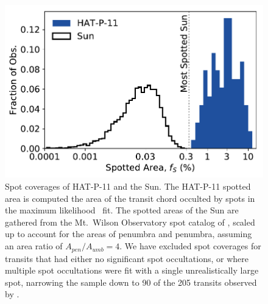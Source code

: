 \begin{figure}
\centering
\includegraphics[scale=0.9]{stsp_hat_p_11/spotted_area.pdf}
\caption{Spot coverages of HAT-P-11 and the Sun. The HAT-P-11 spotted area is computed the area of the transit chord occulted by spots in the maximum likelihood \stsp\ fit. The spotted areas of the Sun are gathered from the Mt.~Wilson Observatory spot catalog of \citet{Howard1984}, scaled up to account for the areas of penumbra and penumbra, assuming an area ratio of $A_{pen} / A_{umb} = 4$. We have excluded spot coverages for transits that had either no significant spot occultations, or where multiple spot occultations were fit with a single unrealistically large spot, narrowing the sample down to 90 of the 205 transits observed by \kepler.}
\label{fig:spotted_area}
\end{figure}

